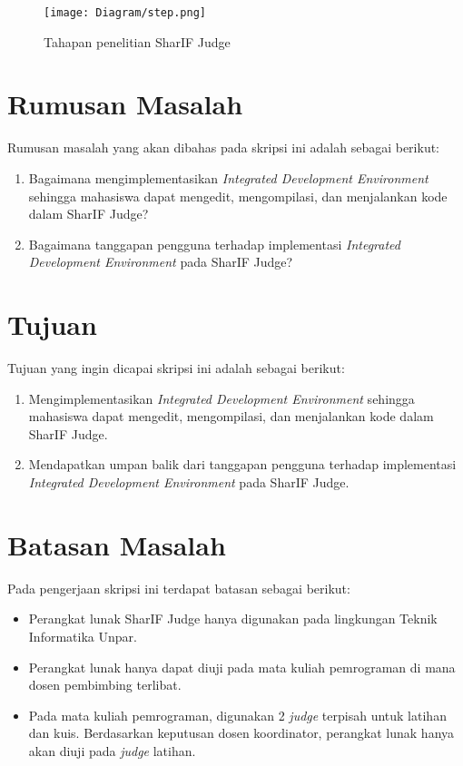 \begin{figure}[H]
	\centering  
	\texttt{[image: Diagram/step.png]}  
	\caption{Tahapan penelitian SharIF Judge}
	\label{fig:1:step} 
\end{figure} 

\section{Rumusan Masalah}
\label{sec:rumusan}
Rumusan masalah yang akan dibahas pada skripsi ini adalah sebagai berikut:
\begin{enumerate}
	\item Bagaimana mengimplementasikan {\it Integrated Development Environment} sehingga mahasiswa dapat mengedit, mengompilasi, dan menjalankan kode dalam SharIF Judge?
	\item Bagaimana tanggapan pengguna terhadap implementasi {\it Integrated Development Environment} pada SharIF Judge? 
\end{enumerate}


\section{Tujuan}
\label{sec:tujuan}
Tujuan yang ingin dicapai skripsi ini adalah sebagai berikut:
\begin{enumerate}
	\item Mengimplementasikan {\it Integrated Development Environment} sehingga mahasiswa dapat mengedit, mengompilasi, dan menjalankan kode dalam SharIF Judge.
	\item Mendapatkan umpan balik dari tanggapan pengguna terhadap implementasi {\it Integrated Development Environment} pada SharIF Judge.
\end{enumerate}

\section{Batasan Masalah}
\label{sec:batasan}
Pada pengerjaan skripsi ini terdapat batasan sebagai berikut:
\begin{itemize}
    \item Perangkat lunak SharIF Judge hanya digunakan pada lingkungan Teknik Informatika Unpar.
    \item Perangkat lunak hanya dapat diuji pada mata kuliah pemrograman di mana dosen pembimbing terlibat.
    \item Pada mata kuliah pemrograman, digunakan 2 \textit{judge} terpisah untuk latihan dan kuis. Berdasarkan keputusan dosen koordinator, perangkat lunak hanya akan diuji pada \textit{judge} latihan.
\end{itemize}


